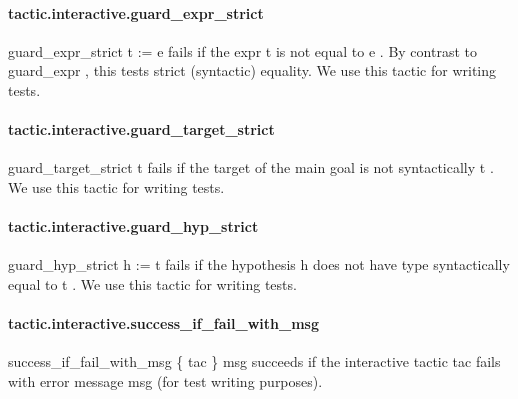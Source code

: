 \documentclass{article}
\begin{document}
\paragraph{tactic.interactive.guard\_expr\_strict}
\par
\colorbox[RGB]{253,246,227}{{{{\color[RGB]{101, 123, 131} guard\_expr\_strict t  }}}{{{\color[RGB]{181, 137, 0} := }}}{{{\color[RGB]{101, 123, 131}  e }}}} fails if the expr 
\colorbox[RGB]{253,246,227}{{{{\color[RGB]{101, 123, 131} t }}}} is not equal to 
\colorbox[RGB]{253,246,227}{{{{\color[RGB]{101, 123, 131} e }}}}. By contrast
to 
\colorbox[RGB]{253,246,227}{{{{\color[RGB]{101, 123, 131} guard\_expr }}}}, this tests strict (syntactic) equality.
We use this tactic for writing tests.
\paragraph{tactic.interactive.guard\_target\_strict}
\par
\colorbox[RGB]{253,246,227}{{{{\color[RGB]{101, 123, 131} guard\_target\_strict t }}}} fails if the target of the main goal is not syntactically 
\colorbox[RGB]{253,246,227}{{{{\color[RGB]{101, 123, 131} t }}}}.
We use this tactic for writing tests.
\paragraph{tactic.interactive.guard\_hyp\_strict}
\par
\colorbox[RGB]{253,246,227}{{{{\color[RGB]{101, 123, 131} guard\_hyp\_strict h  }}}{{{\color[RGB]{181, 137, 0} := }}}{{{\color[RGB]{101, 123, 131}  t }}}} fails if the hypothesis 
\colorbox[RGB]{253,246,227}{{{{\color[RGB]{101, 123, 131} h }}}} does not have type syntactically equal
to 
\colorbox[RGB]{253,246,227}{{{{\color[RGB]{101, 123, 131} t }}}}.
We use this tactic for writing tests.
\paragraph{tactic.interactive.success\_if\_fail\_with\_msg}
\par
\colorbox[RGB]{253,246,227}{{{{\color[RGB]{101, 123, 131} success\_if\_fail\_with\_msg \{ tac \} msg }}}} succeeds if the interactive tactic 
\colorbox[RGB]{253,246,227}{{{{\color[RGB]{101, 123, 131} tac }}}} fails with
error message 
\colorbox[RGB]{253,246,227}{{{{\color[RGB]{101, 123, 131} msg }}}} (for test writing purposes).
\end{document}
